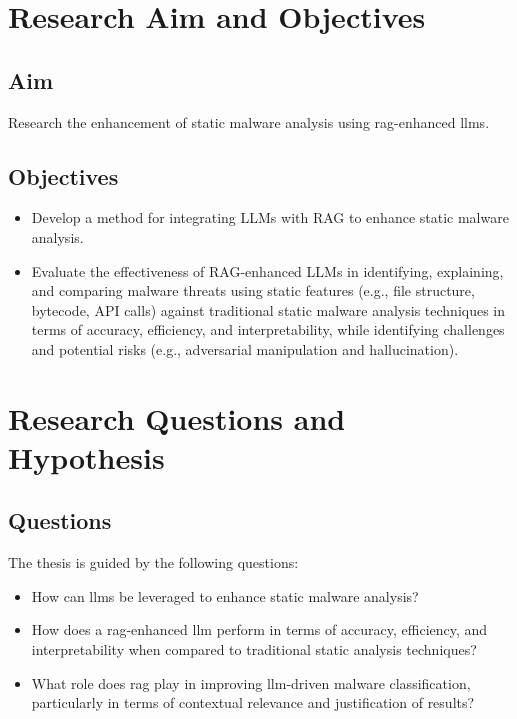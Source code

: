 \section{Research Aim and Objectives}\label{sec:ResearchAimObjectives}

\subsection{Aim}\label{subsec:Aim}
Research the enhancement of static malware analysis using \gls{rag}-enhanced \glspl{llm}.

\subsection{Objectives}\label{subsec:Objectives}
\begin{itemize}
	\item Develop a method for integrating LLMs with RAG to enhance static malware analysis.
	\item Evaluate the effectiveness of RAG-enhanced LLMs in identifying, explaining, and comparing malware
	      threats using static features (e.g., file structure, bytecode, API calls) against traditional
	      static malware analysis techniques in terms of accuracy, efficiency, and interpretability, while
	      identifying challenges and potential risks (e.g., adversarial manipulation and hallucination).
\end{itemize}

\section{Research Questions and Hypothesis}\label{sec:ResearchQuestionsHypothesis}

\subsection{Questions}\label{subsec:Questions}
The thesis is guided by the following questions:
\begin{itemize}
	\item How can \glspl{llm} be leveraged to enhance static malware analysis?
	\item How does a \gls{rag}-enhanced \gls{llm} perform in terms of accuracy, efficiency, and
	      interpretability when compared to traditional static analysis techniques?
	\item What role does \gls{rag} play in improving \gls{llm}-driven malware classification, particularly in
	      terms of contextual relevance and justification of results?
\end{itemize}

